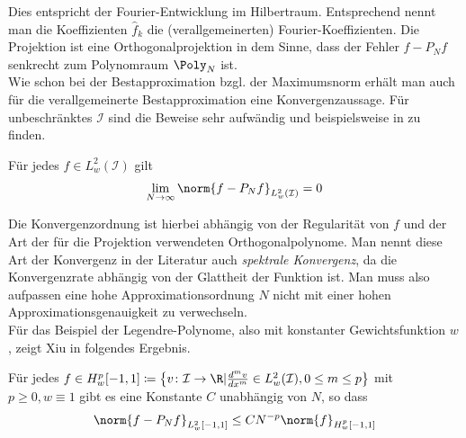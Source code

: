 Dies entspricht der Fourier-Entwicklung im Hilbertraum. Entsprechend nennt man die Koeffizienten $\hat{f}_k$ die (verallgemeinerten) Fourier-Koeffizienten. Die Projektion ist eine Orthogonalprojektion in dem Sinne, dass der Fehler $f-P_Nf$ senkrecht zum Polynomraum $\Poly_N$ ist.\\
Wie schon bei der Bestapproximation bzgl. der Maximumsnorm erhält man auch für die verallgemeinerte Bestapproximation eine Konvergenzaussage. Für unbeschränktes $\mathcal{I}$ sind die Beweise sehr aufwändig und beispielsweise in \autocite{CouHil53} zu finden. 
\begin{maththeorem}
Für jedes $f\in L_w^2(\mathcal{I})$ gilt
\[\lim\limits_{N\to\infty}\norm{f-P_Nf}_{L_w^2(\mathcal{I})}=0\]
\end{maththeorem}
Die Konvergenzordnung ist hierbei abhängig von der Regularität von $f$ und der Art der für die Projektion verwendeten Orthogonalpolynome. Man nennt diese Art der Konvergenz in der Literatur auch \emph{spektrale Konvergenz}, da die Konvergenzrate abhängig von der Glattheit der Funktion ist. Man muss also aufpassen eine hohe Approximationsordnung $N$ nicht mit einer hohen Approximationsgenauigkeit zu verwechseln.\\
Für das Beispiel der Legendre-Polynome, also mit konstanter Gewichtsfunktion $w$, zeigt Xiu in \autocite[Theorem 3.6]{dongbinxiu2010} folgendes Ergebnis.
\begin{maththeorem}
\label{spectralconvth}
Für jedes $f\in H_w^p[-1,1]\coloneqq \left\lbrace v\colon \mathcal{I}\to\R | \frac{d^mv}{dx^m}\in L_w^2(\mathcal{I}),0\le m\le p\right\rbrace$ mit $p\ge 0, w\equiv 1$ gibt es eine Konstante $C$ unabhängig von $N$, so dass
\[\norm{f-P_Nf}_{L_w^2[-1,1]}\le CN^{-p}\norm{f}_{H_w^p[-1,1]}\]
\end{maththeorem}
